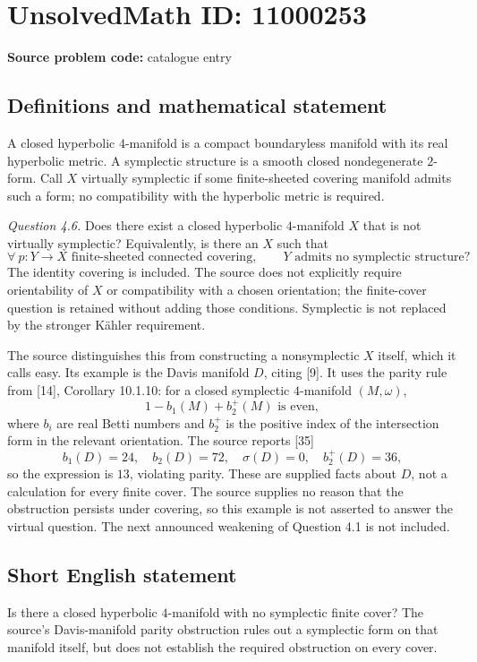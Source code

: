 \documentclass[11pt]{article}
\begin{document}
\section*{UnsolvedMath ID: 11000253}
\textbf{Source problem code:} catalogue entry
\subsection{Definitions and mathematical statement}
A closed hyperbolic \(4\)-manifold is a compact boundaryless manifold with its real hyperbolic metric. A symplectic structure is a smooth closed nondegenerate \(2\)-form. Call \(X\) virtually symplectic if some finite-sheeted covering manifold admits such a form; no compatibility with the hyperbolic metric is required.

\emph{Question 4.6.} Does there exist a closed hyperbolic \(4\)-manifold \(X\) that is not virtually symplectic? Equivalently, is there an \(X\) such that
\[
 \forall\ p:Y\to X\text{ finite-sheeted connected covering},\qquad
 Y\text{ admits no symplectic structure}?
\]
The identity covering is included. The source does not explicitly require orientability of \(X\) or compatibility with a chosen orientation; the finite-cover question is retained without adding those conditions. Symplectic is not replaced by the stronger K\"ahler requirement.

The source distinguishes this from constructing a nonsymplectic \(X\) itself, which it calls easy. Its example is the Davis manifold \(D\), citing [9]. It uses the parity rule from [14], Corollary 10.1.10: for a closed symplectic \(4\)-manifold \((M,\omega)\),
\[
 1-b_1(M)+b_2^+(M)\text{ is even},
\]
where \(b_i\) are real Betti numbers and \(b_2^+\) is the positive index of the intersection form in the relevant orientation. The source reports [35]
\[
 b_1(D)=24,\quad b_2(D)=72,\quad\sigma(D)=0,
 \quad b_2^+(D)=36,
\]
so the expression is \(13\), violating parity. These are supplied facts about \(D\), not a calculation for every finite cover. The source supplies no reason that the obstruction persists under covering, so this example is not asserted to answer the virtual question. The next announced weakening of Question 4.1 is not included.
\subsection{Short English statement}
Is there a closed hyperbolic \(4\)-manifold with no symplectic finite cover? The source's Davis-manifold parity obstruction rules out a symplectic form on that manifold itself, but does not establish the required obstruction on every cover.
\end{document}
